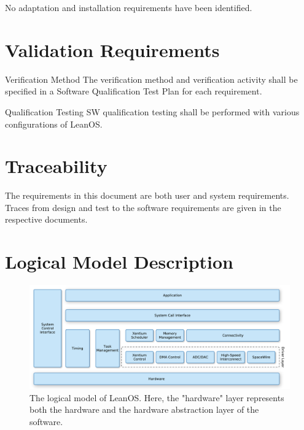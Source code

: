 No adaptation and installation requirements have been identified.


\chapter{Validation Requirements}

 {Verification Method}{%
The verification method and verification activity shall be specified 
in a Software Qualification Test Plan for each requirement.
}{}%

 {Qualification Testing}{%
SW qualification testing shall be performed with various configurations of
LeanOS.
}{}%





\chapter{Traceability}

The requirements in this document are both user and system requirements.
Traces from design and test to the software requirements are given in the
respective documents.


\chapter{Logical Model Description}

\begin{figure}[htb]
\begin{center}
	\includegraphics[width=\columnwidth]{images/OS_logical}
	\caption{The logical model of LeanOS. Here, the "hardware" layer
	represents both the hardware and the hardware abstraction layer of
	the software.}
	\label{fig:logical_model}
\end{center}
\end{figure}

